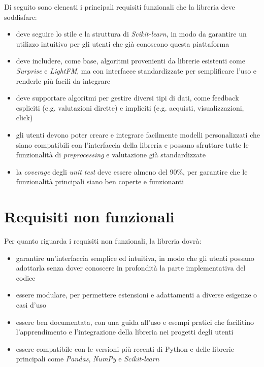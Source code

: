 Di seguito sono elencati i principali requisiti funzionali che la libreria deve soddisfare:

\begin{itemize}
    \item deve seguire lo stile e la struttura di \textit{Scikit-learn}, in modo da garantire un utilizzo intuitivo per gli utenti che già conoscono questa piattaforma
    \item deve includere, come base, algoritmi provenienti da librerie esistenti come \textit{Surprise} e \textit{LightFM}, ma con interfacce standardizzate per semplificare l'uso e renderle più facili da integrare
    \item deve supportare algoritmi per gestire diversi tipi di dati, come feedback espliciti (e.g. valutazioni dirette) e impliciti (e.g. acquisti, visualizzazioni, click)
    \item gli utenti devono poter creare e integrare facilmente modelli personalizzati che siano compatibili con l'interfaccia della libreria e possano sfruttare tutte le funzionalità di \textit{preprocessing} e valutazione già standardizzate
    \item la \textit{coverage} degli \textit{unit test} deve essere almeno del 90\%, per garantire che le funzionalità principali siano ben coperte e funzionanti
\end{itemize}

\section{Requisiti non funzionali}

Per quanto riguarda i requisiti non funzionali, la libreria dovrà:

\begin{itemize}
    \item garantire un'interfaccia semplice ed intuitiva, in modo che gli utenti possano adottarla senza dover conoscere in profondità la parte implementativa del codice
    \item essere modulare, per permettere estensioni e adattamenti a diverse esigenze o casi d'uso
    \item essere ben documentata, con una guida all'uso e esempi pratici che facilitino l'apprendimento e l'integrazione della libreria nei progetti degli utenti
    \item essere compatibile con le versioni più recenti di Python e delle librerie principali come \textit{Pandas}, \textit{NumPy} e \textit{Scikit-learn}
\end{itemize}

